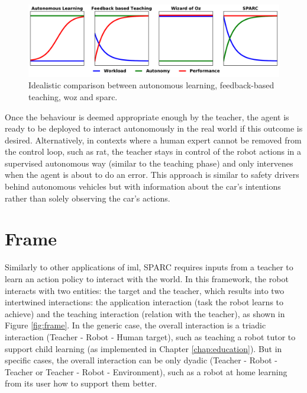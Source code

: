\begin{figure}[ht]
	\includegraphics[width=1\linewidth]{concept.pdf}
	\centering
	\caption{Idealistic comparison between autonomous learning, feedback-based teaching, \gls{woz} and \gls{sparc}.}
	\label{fig:concept}
\end{figure}

Once the behaviour is deemed appropriate enough by the teacher, the agent is ready to be deployed to interact autonomously in the real world if this outcome is desired. Alternatively, in contexts where a human expert cannot be removed from the control loop, such as \acrlong{rat}, the teacher stays in control of the robot actions in a supervised autonomous way (similar to the teaching phase) and only intervenes when the agent is about to do an error. This approach is similar to safety drivers behind autonomous vehicles but with information about the car's intentions rather than solely observing the car's actions. 

\section{Frame}

Similarly to other applications of \gls{iml}, SPARC requires inputs from a teacher to learn an action policy to interact with the world. In this framework, the robot interacts with two entities: the target and the teacher, which results into two intertwined interactions: the application interaction (task the robot learns to achieve) and the teaching interaction (relation with the teacher), as shown in Figure \ref{fig:frame}. In the generic case, the overall interaction is a triadic interaction (Teacher - Robot - Human target), such as teaching a robot tutor to support child learning (as implemented in Chapter \ref{chap:education}). But in specific cases, the overall interaction can be only dyadic (Teacher - Robot - Teacher or Teacher - Robot - Environment), such as a robot at home learning from its user how to support them better.

